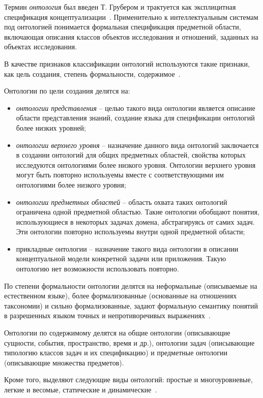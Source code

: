 Термин \textit{онтология} был введен Т. Грубером и трактуется как эксплицитная спецификация концептуализации~\cite{Gruber1995}. Применительно к интеллектуальным системам под онтологией понимается формальная спецификация предметной области, включающая описания классов объектов исследования и отношений, заданных на объектах исследования. 

В качестве признаков классификации онтологий используются такие признаки, как цель создания, степень формальности, содержимое~\cite{Dobrov2006}. 

Онтологии по цели создания делятся на:
\begin{itemize}
  \item \textit{онтологии представления} – целью такого вида онтологии является описание области представления знаний, создание языка для спецификации онтологий более низких уровней;
  \item \textit{онтологии верхнего уровня} – назначение данного вида онтологий заключается в создании онтологий для общих предметных областей, свойства которых исследуются онтологиями более низкого уровня. Онтологии верхнего уровня могут быть повторно используемы вместе с соответствующими им онтологиями более низкого уровня;
  \item \textit{онтологии предметных областей} – область охвата таких онтологий ограничена одной предметной областью. Такие онтологии обобщают понятия, использующиеся в некоторых задачах домена, абстрагируясь от самих задач. Эти онтологии повторно используемы внутри одной предметной области;
  \item прикладные онтологии – назначение такого вида онтологии в описании концептуальной модели конкретной задачи или приложения. Такую онтологию нет возможности использовать повторно.
\end{itemize}

По степени формальности онтологии делятся на неформальные (описываемые на естественном языке), более формализованные (основанные на отношениях таксономии) и сильно формализованные, задают формальную семантику понятий в разрешенных языком точных и непротиворечивых выражениях~\cite{Nikonenko2009}.

Онтологии по содержимому делятся на общие онтологии (описывающие сущности, события, пространство, время и др.), онтологии задач (описывающие типологию классов задач и их спецификацию) и предметные онтологии (описывающие множества предметов).

Кроме того, выделяют следующие виды онтологий: простые и многоуровневые, легкие и весомые, статические и динамические~\cite{Kleschev2001}. 

